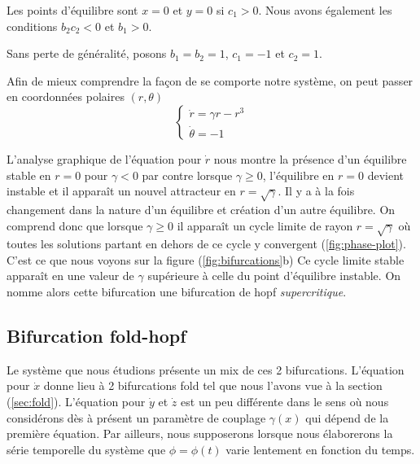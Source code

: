 Les points d'équilibre sont $x = 0$ et $y = 0$ si $c_1 > 0$. Nous avons également les conditions $b_2c_2 < 0$ et $b_1 > 0$.

Sans perte de généralité, posons $b_1 = b_2 = 1$, $c_1 = -1$ et $c_2 = 1$.


Afin de mieux comprendre la façon de se comporte notre système, on peut passer en coordonnées polaires $(r, \theta)$
\begin{equation}
  \begin{cases}
    \dot{r} = \gamma r - r^3 \\
    \dot{\theta} = -1
  \end{cases}
\end{equation}

L'analyse graphique de l'équation pour $\dot{r}$ nous montre la présence d'un équilibre stable en $r = 0$ pour $\gamma < 0$ par contre lorsque $\gamma \geq 0$, l'équilibre en $r = 0$ devient instable et il apparaît un nouvel attracteur en $r = \sqrt{\gamma}$. Il y a à la fois changement dans la nature d'un équilibre et création d'un autre équilibre. On comprend donc que lorsque $\gamma \geq 0$ il apparaît un cycle limite de rayon $r = \sqrt{\gamma}$ où toutes les solutions partant en dehors de ce cycle y convergent (\autoref{fig:phase-plot}). C'est ce que nous voyons sur la figure (\ref{fig:bifurcations}b) Ce cycle limite stable apparaît en une valeur de $\gamma$ supérieure à celle du point d'équilibre instable. On nomme alors cette bifurcation une bifurcation de hopf \emph{supercritique}.

\subsection{Bifurcation fold-hopf}

Le système que nous étudions présente un mix de ces 2 bifurcations. L'équation pour $\dot{x}$ donne lieu à 2 bifurcations fold tel que nous l'avons vue à la section (\ref{sec:fold}). L'équation pour $\dot{y}$ et $\dot{z}$ est un peu différente dans le sens où nous considérons dès à présent un paramètre de couplage $\gamma(x)$ qui dépend de la première équation. Par ailleurs, nous supposerons lorsque nous élaborerons la série temporelle du système que $\phi = \phi(t)$ varie lentement en fonction du temps.


